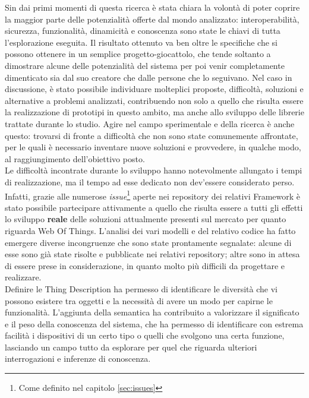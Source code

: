 \documentclass[12pt,a4paper,openright,oneside]{report}
\begin{document}
Sin dai primi momenti di questa ricerca è stata chiara la volontà di poter coprire la maggior parte delle potenzialità offerte dal mondo analizzato: interoperabilità, sicurezza, funzionalità, dinamicità e conoscenza sono state le chiavi di tutta l'esplorazione eseguita. Il risultato ottenuto va ben oltre le specifiche che si possono ottenere in un semplice progetto-giocattolo, che tende soltanto a dimostrare alcune delle potenzialità del sistema per poi venir completamente dimenticato sia dal suo creatore che dalle persone che lo seguivano. Nel caso in discussione, è stato possibile individuare molteplici proposte, difficoltà, soluzioni e alternative a problemi analizzati, contribuendo non solo a quello che risulta essere la realizzazione di prototipi in questo ambito, ma anche allo sviluppo delle librerie trattate durante lo studio. Agire nel campo sperimentale e della ricerca è anche questo: trovarsi di fronte a difficoltà che non sono state comunemente affrontate, per le quali è necessario inventare nuove soluzioni e provvedere, in qualche modo, al raggiungimento dell'obiettivo posto.\\

Le difficoltà incontrate durante lo sviluppo hanno notevolmente allungato i tempi di realizzazione, ma il tempo ad esse dedicato non dev'essere considerato perso. Infatti, grazie alle numerose \textit{issue}\footnote{Come definito nel capitolo \ref{sec:issues}} aperte nei repository dei relativi Framework è stato possibile partecipare attivamente a quello che risulta essere a tutti gli effetti lo sviluppo \textbf{reale} delle soluzioni attualmente presenti sul mercato per quanto riguarda Web Of Things. L'analisi dei vari modelli e del relativo codice ha fatto emergere diverse incongruenze che sono state prontamente segnalate: alcune di esse sono già state risolte e pubblicate nei relativi repository; altre sono in attesa di essere prese in considerazione, in quanto molto più difficili da progettare e realizzare.\\

Definire le Thing Description ha permesso di identificare le diversità che vi possono esistere tra oggetti e la necessità di avere un modo per capirne le funzionalità. L'aggiunta della semantica ha contribuito a valorizzare il significato e il peso della conoscenza del sistema, che ha permesso di identificare con estrema facilità i dispositivi di un certo tipo o quelli che svolgono una certa funzione, lasciando un campo tutto da esplorare per quel che riguarda ulteriori interrogazioni e inferenze di conoscenza.\\
\end{document}
